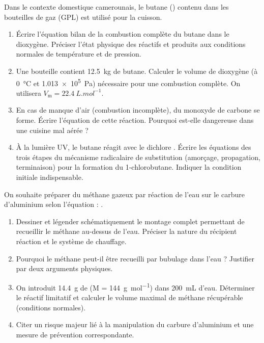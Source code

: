 \documentclass[11pt]{article}
\begin{document}
\begin{exercice}
Dans le contexte domestique camerounais, le butane () contenu dans les bouteilles de gaz (GPL) est utilisé pour la cuisson.
\begin{enumerate}
    \item Écrire l'équation bilan de la combustion complète du butane dans le dioxygène. Préciser l'état physique des réactifs et produits aux conditions normales de température et de pression.
    \item Une bouteille contient \SI{12,5}{kg} de butane. Calculer le volume de dioxygène (à \SI{0}{\celsius} et \SI{1,013e5}{Pa}) nécessaire pour une combustion complète. On utilisera $V_{\text{m}} = \SI{22,4}{L.mol^{-1}}$.
    \item En cas de manque d'air (combustion incomplète), du monoxyde de carbone  se forme. Écrire l'équation de cette réaction. Pourquoi est-elle dangereuse dans une cuisine mal aérée ?
    \item À la lumière UV, le butane réagit avec le dichlore . Écrire les équations des trois étapes du mécanisme radicalaire de substitution (amorçage, propagation, terminaison) pour la formation du 1-chlorobutane. Indiquer la condition initiale indispensable.
\end{enumerate}
\end{exercice}

\begin{exercice}
On souhaite préparer du méthane gazeux par réaction de l'eau sur le carbure d'aluminium  selon l'équation :
.
\begin{enumerate}
    \item Dessiner et légender schématiquement le montage complet permettant de recueillir le méthane au-dessus de l'eau. Préciser la nature du récipient réaction et le système de chauffage.
    \item Pourquoi le méthane peut-il être recueilli par bubulage dans l'eau ? Justifier par deux arguments physiques.
    \item On introduit \SI{14,4}{g} de  (M = \SI{144}{g.mol^{-1}}) dans \SI{200}{mL} d'eau. Déterminer le réactif limitatif et calculer le volume maximal de méthane récupérable (conditions normales).
    \item Citer un risque majeur lié à la manipulation du carbure d'aluminium et une mesure de prévention correspondante.
\end{enumerate}
\end{exercice}
\end{document}
